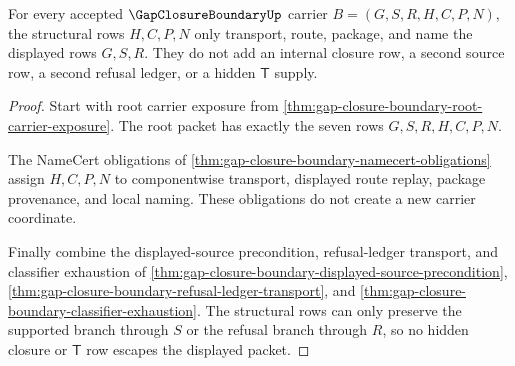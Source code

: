 \begin{theorem}
\label{thm:gap-closure-boundary-root-structural-nonescape}
For every accepted $\GapClosureBoundaryUp$ carrier $B=(G,S,R,H,C,P,N)$, the structural rows $H,C,P,N$ only transport, route, package, and name the displayed rows $G,S,R$. They do not add an internal closure row, a second source row, a second refusal ledger, or a hidden $\mathsf{T}$ supply.
\end{theorem}
\begin{proof}
Start with root carrier exposure from \autoref{thm:gap-closure-boundary-root-carrier-exposure}. The root packet has exactly the seven rows $G,S,R,H,C,P,N$.

The NameCert obligations of \autoref{thm:gap-closure-boundary-namecert-obligations} assign $H,C,P,N$ to componentwise transport, displayed route replay, package provenance, and local naming. These obligations do not create a new carrier coordinate.

Finally combine the displayed-source precondition, refusal-ledger transport, and classifier exhaustion of \autoref{thm:gap-closure-boundary-displayed-source-precondition}, \autoref{thm:gap-closure-boundary-refusal-ledger-transport}, and \autoref{thm:gap-closure-boundary-classifier-exhaustion}. The structural rows can only preserve the supported branch through $S$ or the refusal branch through $R$, so no hidden closure or $\mathsf{T}$ row escapes the displayed packet.
\end{proof}

